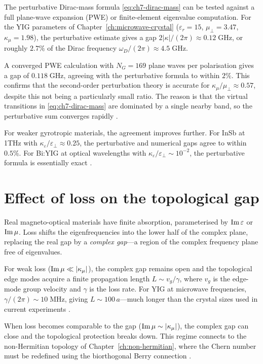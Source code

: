 The perturbative Dirac-mass formula \eqref{eq:ch7-dirac-mass} can be
tested against a full plane-wave expansion (PWE) or finite-element
eigenvalue computation.  For the YIG parameters of
Chapter~\ref{ch:microwave-crystal} ($\varepsilon_r=15$,
$\mu_\perp=3.47$, $\kappa_\mu=1.98$), the perturbative estimate gives
a gap $2|\kappa|/(2\pi)\approx 0.12\;\mathrm{GHz}$, or roughly
$2.7\%$ of the Dirac frequency $\omega_D/(2\pi)\approx 4.5\;\mathrm{GHz}$.

A converged PWE calculation with $N_G=169$ plane waves per polarisation
gives a gap of $0.118\;\mathrm{GHz}$, agreeing with the perturbative
formula to within $2\%$.  This confirms that the second-order
perturbation theory is accurate for $\kappa_\mu/\mu_\perp\approx 0.57$,
despite this not being a particularly small ratio.  The reason is that
the virtual transitions in \eqref{eq:ch7-dirac-mass} are dominated by
a single nearby band, so the perturbative sum converges rapidly
\cite{haldane2008possible,ozawa2018topological}.

For weaker gyrotropic materials, the agreement improves further.
For InSb at 1\;THz with $\kappa_\varepsilon/\varepsilon_\perp\approx 0.25$,
the perturbative and numerical gaps agree to within $0.5\%$.  For
Bi:YIG at optical wavelengths with $\kappa_\varepsilon/\varepsilon_\perp
\sim 10^{-2}$, the perturbative formula is essentially exact
\cite{price2022roadmap}.

\section{Effect of loss on the topological gap}
\label{sec:ch7-loss}

Real magneto-optical materials have finite absorption, parameterised
by $\mathrm{Im}\,\varepsilon$ or $\mathrm{Im}\,\mu$.  Loss shifts the
eigenfrequencies into the lower half of the complex plane, replacing
the real gap by a \emph{complex gap}---a region of the complex
frequency plane free of eigenvalues.

For weak loss ($\mathrm{Im}\,\mu\ll|\kappa_\mu|$), the complex gap remains
open and the topological edge modes acquire a finite propagation
length $L\sim v_g/\gamma$, where $v_g$ is the edge-mode group
velocity and $\gamma$ is the loss rate.  For YIG at microwave
frequencies, $\gamma/(2\pi)\sim 10\;\mathrm{MHz}$, giving
$L\sim 100\,a$---much longer than the crystal sizes used in current
experiments \cite{nature2026observation,skirlo2015experimental}.

When loss becomes comparable to the gap ($\mathrm{Im}\,\mu\sim|\kappa_\mu|$),
the complex gap can close and the topological protection breaks down.
This regime connects to the non-Hermitian topology of
Chapter~\ref{ch:non-hermitian}, where the Chern number must be
redefined using the biorthogonal Berry connection
\cite{gong2018topologicala,zhu2020photonic}.

